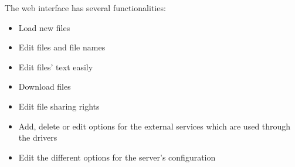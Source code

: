 The web interface has several functionalities:
\begin{itemize}
\renewcommand{\labelitemi}{$\bullet$}
    \item Load new files
    \item Edit files and file names
    \item Edit files' text easily
    \item Download files
    \item Edit file sharing rights
    \item Add, delete or edit options for the external services which are used through the drivers
    \item Edit the different options for the server's configuration
\end{itemize}
